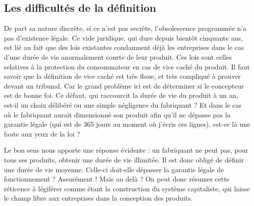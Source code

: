 \subsection{Les difficultés de la définition}

De part sa nature discrète, si ce n'est pas secrète, l'obsolescence programmée n'a pas d'existence légale. Ce vide juridique, qui dure depuis bientôt cinquante ans, est lié au fait que des lois existantes condamnent déjà les entreprises dans le cas d'une durée de vie anormalement courte de leur produit. Ces lois sont celles relatives à la protection du consommateur en cas de vice caché du produit. Il faut savoir que la définition de vice caché est très floue, et très compliqué à prouver devant un tribunal.
\medbreak
Car le grand problème ici est de déterminer si le concepteur est de bonne foi. Ce défaut, qui raccourcit la durée de vie du produit à un an, est-il un choix délibéré ou une simple négligence du fabriquant ? Et dans le cas où le fabriquant aurait dimensionné son produit afin qu'il ne dépasse pas la garantie légale (qui est de 365 jours au moment où j'écris ces lignes), est-ce là une faute aux yeux de la loi ?

Le bon sens nous apporte une réponse évidente : un fabriquant ne peut pas, pour tous ses produits, obtenir une durée de vie illimitée. Il est donc obligé de définir une durée de vie moyenne. Celle-ci doit-elle dépasser la garantie légale de fonctionnement ? Assurément ! Mais au delà ?
\bigbreak
On peut donc résumer cette réticence à légiférer comme étant la construction du système capitaliste, qui laisse le champ libre aux entreprises dans la conception des produits.
